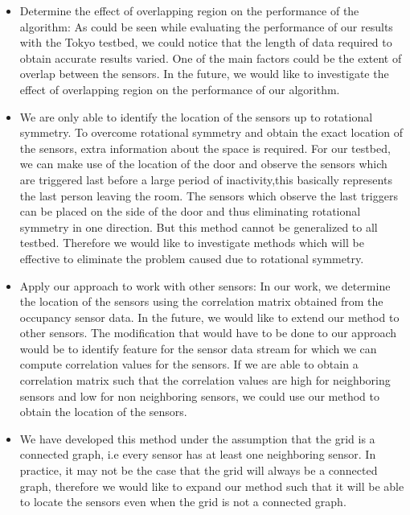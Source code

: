 \begin{itemize}
\item Determine the effect of overlapping region on the performance of the algorithm: As could be seen while evaluating the performance of our results with the Tokyo testbed, we could notice that the length of data required to obtain accurate results varied. One of the main factors could be the extent of overlap between the sensors. In the future, we would like to investigate the effect of overlapping region on the performance of our algorithm.
\item We are only able to identify the location of the sensors up to rotational symmetry. To overcome rotational symmetry and obtain the exact location of the sensors, extra information about the space is required. For our testbed, we can make use of the location of the door and observe the sensors which are triggered last before a large period of inactivity,this basically represents the last person leaving the room. The sensors which observe the last triggers can be placed on the side of the door and thus eliminating rotational symmetry in one direction. But this method cannot be generalized to all testbed. Therefore we would like to investigate methods which will be effective to eliminate the problem caused due to rotational symmetry.
\item Apply our approach to work with other sensors: In our work, we determine the location of the sensors using the correlation matrix obtained from the occupancy sensor data.
In the future, we would like to extend our method to other sensors. The modification that would have to be done to our approach would be to identify feature for the sensor data stream for which we can compute correlation values for the sensors. If we are able to obtain a correlation matrix such that the correlation values are high for neighboring sensors and low for non neighboring sensors, we could use our method to obtain the location of the sensors.
\item We have developed this method under the assumption that the grid is a connected graph, i.e every sensor has at least one neighboring sensor. In practice, it may not be the case that the grid will always be a connected graph, therefore we would like to expand our method such that it will be able to locate the sensors even when the grid is not a connected graph.
\end{itemize}